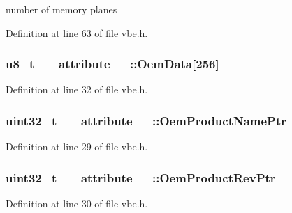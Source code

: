 number of memory planes 



Definition at line 63 of file vbe.\+h.

\hypertarget{struct____attribute_____ac3f69bedeb0dc55c1ee1bd481a74b08e}{}
\subsubsection[{Oem\+Data}]{\setlength{\rightskip}{0pt plus 5cm}u8\+\_\+t \+\_\+\+\_\+attribute\+\_\+\+\_\+\+::\+Oem\+Data\mbox{[}256\mbox{]}}\label{struct____attribute_____ac3f69bedeb0dc55c1ee1bd481a74b08e}


Definition at line 32 of file vbe.\+h.

\hypertarget{struct____attribute_____a79d41d28ea7c0aa5c8f36e46c92ee2d0}{}
\subsubsection[{Oem\+Product\+Name\+Ptr}]{\setlength{\rightskip}{0pt plus 5cm}uint32\+\_\+t \+\_\+\+\_\+attribute\+\_\+\+\_\+\+::\+Oem\+Product\+Name\+Ptr}\label{struct____attribute_____a79d41d28ea7c0aa5c8f36e46c92ee2d0}


Definition at line 29 of file vbe.\+h.

\hypertarget{struct____attribute_____aa746b73bc137e19abbbac805a97594b9}{}
\subsubsection[{Oem\+Product\+Rev\+Ptr}]{\setlength{\rightskip}{0pt plus 5cm}uint32\+\_\+t \+\_\+\+\_\+attribute\+\_\+\+\_\+\+::\+Oem\+Product\+Rev\+Ptr}\label{struct____attribute_____aa746b73bc137e19abbbac805a97594b9}


Definition at line 30 of file vbe.\+h.

